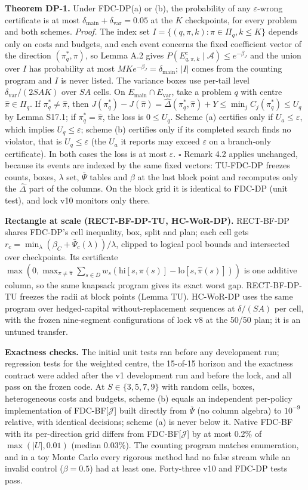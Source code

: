 \documentclass[sigconf,anonymous,review]{acmart}
\newcommand{\cA}{\mathcal{A}}
\newcommand{\eps}{\varepsilon}
\newcommand{\dmain}{\delta_{\text{main}}}
\newcommand{\dvar}{\delta_{\text{var}}}
\begin{document}
\textbf{Theorem DP-1.} Under FDC-DP(a) or (b), the probability of any $\eps$-wrong certificate is at most $\dmain + \dvar = 0.05$ at the $K$ checkpoints, for every problem and both schemes. \emph{Proof.} The index set $I = \{(q,\pi,k) : \pi \in \Pi_q, k \le K\}$ depends only on costs and budgets, and each event concerns the fixed coefficient vector of the direction $(\pi^*_q, \pi)$, so Lemma A.2 gives $P(E^c_{q,\pi,k} \mid \cA) \le e^{-\beta_J}$ and the union over $I$ has probability at most $MKe^{-\beta_J} = \dmain$; $|I|$ comes from the counting program and $I$ is never listed. The variance boxes use per-tail level $\dvar/(2SAK)$ over $SA$ cells. On $E_{\text{main}} \cap E_{\text{var}}$, take a problem $q$ with centre $\hat\pi \in \Pi_q$. If $\pi^*_q \ne \hat\pi$, then $J(\pi^*_q) - J(\hat\pi) = \hat\Delta(\pi^*_q,\hat\pi) + Y \le \min_j C_j(\pi^*_q) \le U_q$ by Lemma S17.1; if $\pi^*_q = \hat\pi$, the loss is $0 \le U_q$. Scheme (a) certifies only if $U_a \le \eps$, which implies $U_q \le \eps$; scheme (b) certifies only if its completed search finds no violator, that is $U_q \le \eps$ (the $U_a$ it reports may exceed $\eps$ on a branch-only certificate). In both cases the loss is at most $\eps$. $\square$ Remark 4.2 applies unchanged, because its events are indexed by the same fixed vectors: TU-FDC-DP freezes counts, boxes, $\lambda$ set, $\bar\Psi$ tables and $\beta$ at the last block point and recomputes only the $\hat\Delta$ part of the columns. On the block grid it is identical to FDC-DP (unit test), and lock v10 monitors only there.

\textbf{Rectangle at scale (RECT-BF-DP-TU, HC-WoR-DP).} RECT-BF-DP shares FDC-DP's cell inequality, box, split and plan; each cell gets $r_c = \min_\lambda (\beta_C + \bar\Psi_c(\lambda))/\lambda$, clipped to logical pool bounds and intersected over checkpoints. Its certificate $\max(0, \max_{\pi \ne \hat\pi} \sum_{s \in D} w_s(\mathrm{hi}[s,\pi(s)] - \mathrm{lo}[s,\hat\pi(s)]))$ is one additive column, so the same knapsack program gives its exact worst gap. RECT-BF-DP-TU freezes the radii at block points (Lemma TU). HC-WoR-DP uses the same program over hedged-capital without-replacement sequences at $\delta/(SA)$ per cell, with the frozen nine-segment configurations of lock v8 at the 50/50 plan; it is an untuned transfer.

\textbf{Exactness checks.} The initial unit tests ran before any development run; regression tests for the weighted centre, the 15-of-15 horizon and the exactness contract were added after the v1 development run and before the lock, and all pass on the frozen code. At $S \in \{3,5,7,9\}$ with random cells, boxes, heterogeneous costs and budgets, scheme (b) equals an independent per-policy implementation of FDC-BF[$\mathcal{J}$] built directly from $\bar\Psi$ (no column algebra) to $10^{-9}$ relative, with identical decisions; scheme (a) is never below it. Native FDC-BF with its per-direction grid differs from FDC-BF[$\mathcal{J}$] by at most 0.2\% of $\max(|U|, 0.01)$ (median 0.03\%). The counting program matches enumeration, and in a toy Monte Carlo every rigorous method had no false stream while an invalid control ($\beta = 0.5$) had at least one. Forty-three v10 and FDC-DP tests pass.
\end{document}
